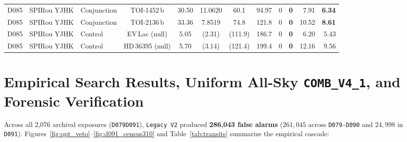 \documentclass[twocolumn,10pt]{article}
\begin{document}
\begin{table}[!t]
{\begin{tabular}{lllcccccccrr}
D085 & SPIRou YJHK & Conjunction & TOI-1452\,b         & 30.50  & 11.0620 & 60.1 & 94.97 & 0 & \textbf{0} & 7.91   & \textbf{6.34} \\
D085 & SPIRou YJHK & Conjunction & TOI-2136\,b         & 33.36  & 7.8519 & 74.8  & 121.8 & 0 & \textbf{0} & 10.52  & \textbf{8.61} \\
D085 & SPIRou YJHK & Control     & EV\,Lac (null)      & 5.05   & (2.31) & (111.9) & 186.7 & 0 & \textbf{0} & 6.20   & 5.43 \\
D085 & SPIRou YJHK & Control     & HD\,36395 (null)    & 5.70   & (3.14) & (121.4) & 199.4 & 0 & \textbf{0} & 12.16  & 9.56 \\
\bottomrule
\end{tabular}%
}
\end{table}

\section{Empirical Search Results, Uniform All-Sky \texttt{COMB\_V4\_1}, and Forensic Verification}
Across all 2,076 archival exposures (\texttt{D079}\text{--}\texttt{D091}), \texttt{Legacy V2} produced \textbf{286,043 false alarms} ($261{,}045$ across \texttt{D079-D090} and $24{,}998$ in \texttt{D091}). Figures~\ref{fig:opt_veto}--\ref{fig:d091_census310} and Table~\ref{tab:transits} summarize the empirical cascade:
\end{document}
